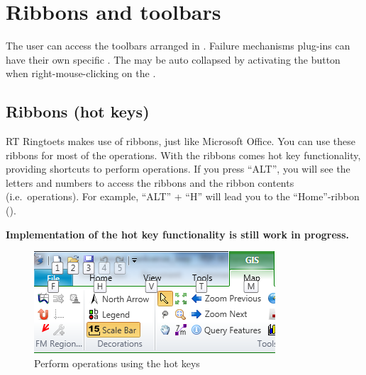 
\section{Ribbons and toolbars}
\label{sec:ribbons}
The user can access the toolbars arranged in . Failure mechanisms plug-ins can have their own specific . The  may be auto collapsed by activating the  button when right-mouse-clicking on the .

\subsection{Ribbons (hot keys)}\label{subsec:gettingstarted_ribons}

RT Ringtoets makes use of ribbons, just like Microsoft Office. You can use these ribbons for most of the operations. 
With the ribbons comes hot key functionality, providing shortcuts to perform operations.
If you press ``ALT'', you will see the letters and numbers to access the ribbons and the ribbon contents (i.e.\ operations). For example, ``ALT'' + ``H'' will lead you to the ``Home''-ribbon ().

\textbf{\Note Implementation of the hot key functionality is still work in progress.}

\begin{figure}[H]
	\centering
	\includegraphics{figures/chapter_overview/rt_ribbon_hotkey.png}
	\caption{Perform operations using the hot keys} \label{fig:ribbonhotkey}
\end{figure}

